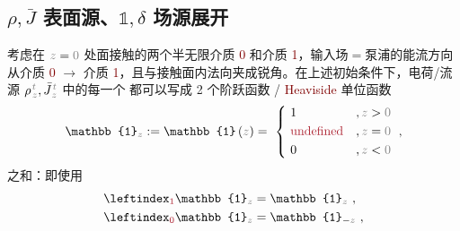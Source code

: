 \subsection{${\rho}, \bar{J}$ 表面源、${\mathbb{1}},\delta$ 场源展开}\label{ssec:step-delta}

考虑在 $\mathcolor{gray}{z} = \mathcolor{gray}{0}$ 处面接触的两个半无限介质 \textcolor{Maroon}{0} 和介质 \textcolor{Maroon}{1}，输入场$=$泵浦的能流方向从介质 \textcolor{Maroon}{0} $\to$ 介质 \textcolor{Maroon}{1}，且与接触面内法向夹成锐角。在上述初始条件下，电荷/流源 ${\rho}^{\;\!\mathcolor{gray}{t}}_{\;\!\mathcolor{gray}{z}}, \bar{J}^{\;\!\mathcolor{gray}{t}}_{\;\!\mathcolor{gray}{z}}$ 中的每一个 都可以写成 2 个阶跃函数 / \textcolor{Maroon}{Heaviside} 单位函数
\begin{align} \label{eq:u}
	\mathbb{1}_{\mathcolor{gray}{z}} := \mathbb{1} \left( \mathcolor{gray}{z} \right) = ~\left\{~ \begin{aligned} 
		&1 &&, \mathcolor{gray}{z \mathcolor{black}{>} 0} \\ 
		&\textcolor{Maroon}{\text{undefined}} &&, \mathcolor{gray}{z \mathcolor{black}{=} 0} \\
		&0 &&, \mathcolor{gray}{z \mathcolor{black}{<} 0} \end{aligned}\right. ~,
\end{align}
之和：即使用
\begin{subequations} \label{eq:u-01}
	\abovedisplayskip=-5pt
	\belowdisplayskip=10pt
\begin{align}
	\leftindex_{\textcolor{Maroon}{1}} {\mathbb{1}}_{\mathcolor{gray}{z}} &= {\mathbb{1}}_{\mathcolor{gray}{z}} ~, \label{eq:u-1} \\ 
	\leftindex_{\textcolor{Maroon}{0}} {\mathbb{1}}_{\mathcolor{gray}{z}} &= {\mathbb{1}}_{ - \mathcolor{gray}{z} } ~, \label{eq:u-0}
\end{align}
\end{subequations}
